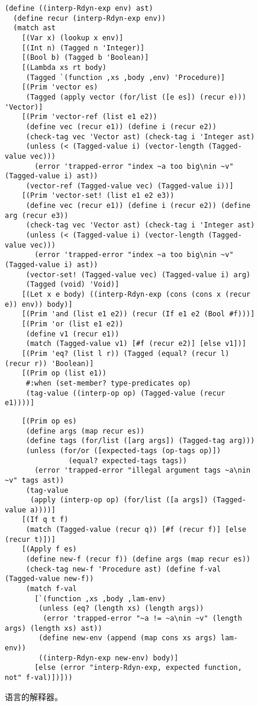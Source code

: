 \documentclass[11pt]{book}
\begin{document}
\begin{figure}[tbp]
\begin{lstlisting}
(define ((interp-Rdyn-exp env) ast)
  (define recur (interp-Rdyn-exp env))
  (match ast
    [(Var x) (lookup x env)]
    [(Int n) (Tagged n 'Integer)]
    [(Bool b) (Tagged b 'Boolean)]
    [(Lambda xs rt body)
     (Tagged `(function ,xs ,body ,env) 'Procedure)]
    [(Prim 'vector es)
     (Tagged (apply vector (for/list ([e es]) (recur e))) 'Vector)]
    [(Prim 'vector-ref (list e1 e2))
     (define vec (recur e1)) (define i (recur e2))
     (check-tag vec 'Vector ast) (check-tag i 'Integer ast)
     (unless (< (Tagged-value i) (vector-length (Tagged-value vec)))
       (error 'trapped-error "index ~a too big\nin ~v" (Tagged-value i) ast))
     (vector-ref (Tagged-value vec) (Tagged-value i))]
    [(Prim 'vector-set! (list e1 e2 e3))
     (define vec (recur e1)) (define i (recur e2)) (define arg (recur e3))
     (check-tag vec 'Vector ast) (check-tag i 'Integer ast)
     (unless (< (Tagged-value i) (vector-length (Tagged-value vec)))
       (error 'trapped-error "index ~a too big\nin ~v" (Tagged-value i) ast))
     (vector-set! (Tagged-value vec) (Tagged-value i) arg)
     (Tagged (void) 'Void)]
    [(Let x e body) ((interp-Rdyn-exp (cons (cons x (recur e)) env)) body)]
    [(Prim 'and (list e1 e2)) (recur (If e1 e2 (Bool #f)))]
    [(Prim 'or (list e1 e2))
     (define v1 (recur e1))
     (match (Tagged-value v1) [#f (recur e2)] [else v1])]
    [(Prim 'eq? (list l r)) (Tagged (equal? (recur l) (recur r)) 'Boolean)]
    [(Prim op (list e1))
     #:when (set-member? type-predicates op)
     (tag-value ((interp-op op) (Tagged-value (recur e1))))]
\end{lstlisting}
\end{figure}
\begin{figure}[tbp]
\begin{lstlisting}     
    [(Prim op es)
     (define args (map recur es))
     (define tags (for/list ([arg args]) (Tagged-tag arg)))
     (unless (for/or ([expected-tags (op-tags op)])
               (equal? expected-tags tags))
       (error 'trapped-error "illegal argument tags ~a\nin ~v" tags ast))
     (tag-value
      (apply (interp-op op) (for/list ([a args]) (Tagged-value a))))]
    [(If q t f)
     (match (Tagged-value (recur q)) [#f (recur f)] [else (recur t)])]
    [(Apply f es)
     (define new-f (recur f)) (define args (map recur es))
     (check-tag new-f 'Procedure ast) (define f-val (Tagged-value new-f))
     (match f-val 
       [`(function ,xs ,body ,lam-env)
        (unless (eq? (length xs) (length args))
         (error 'trapped-error "~a != ~a\nin ~v" (length args) (length xs) ast))
        (define new-env (append (map cons xs args) lam-env))
        ((interp-Rdyn-exp new-env) body)]
       [else (error "interp-Rdyn-exp, expected function, not" f-val)])]))
\end{lstlisting}
\caption{ \LangDyn{} 语言的解释器。}
\label{fig:interp-Rdyn}
\end{figure}
\end{document}

